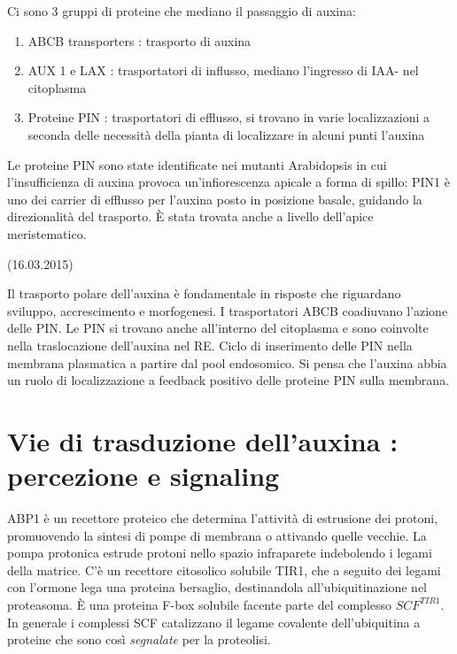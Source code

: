 \documentclass[a4paper,12pt]{book}
\begin{document}
Ci sono 3 gruppi di proteine che mediano il passaggio di auxina: 
\begin{enumerate}
\item{ABCB transporters : trasporto di auxina}
\item{AUX 1 e LAX : trasportatori di influsso, mediano l'ingresso di IAA- nel citoplasma}
\item{Proteine PIN : trasportatori di efflusso, si trovano in varie localizzazioni a seconda delle necessità della pianta di localizzare in alcuni punti l'auxina}
\end{enumerate}

Le proteine PIN sono state identificate nei mutanti Arabidopsis in cui l'insufficienza di auxina provoca un'infiorescenza apicale a forma di spillo: PIN1 è uno dei carrier di efflusso per l'auxina posto in posizione basale, guidando la direzionalità del trasporto. È stata trovata anche a livello dell'apice meristematico.

(16.03.2015)

Il trasporto polare dell'auxina è fondamentale in risposte che riguardano sviluppo, accrescimento e morfogenesi. I trasportatori ABCB coadiuvano l'azione delle PIN. Le PIN si trovano anche all'interno del citoplasma e sono coinvolte nella traslocazione dell'auxina nel RE. Ciclo di inserimento delle PIN nella membrana plasmatica a partire dal pool endosomico. Si pensa che l'auxina abbia un ruolo di localizzazione a feedback positivo delle proteine PIN sulla membrana.

\section{Vie di trasduzione dell'auxina : percezione e signaling}
ABP1 è un recettore proteico che determina l'attività di estrusione dei protoni, promuovendo la sintesi di pompe di membrana o attivando quelle vecchie.
La pompa protonica
estrude protoni nello spazio infraparete indebolendo i legami della matrice.
C'è un recettore citosolico solubile TIR1, che a seguito dei legami con l'ormone lega una proteina bersaglio, destinandola all'ubiquitinazione nel proteasoma. È una proteina F-box solubile facente parte del complesso $SCF^{TIR1}$. In generale i complessi SCF
catalizzano il legame covalente dell’ubiquitina a proteine che sono così \emph{segnalate} per la proteolisi.
\end{document}

